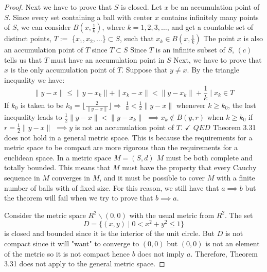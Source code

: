 \documentclass[aps,pra,notitlepage,amsmath,amssymb,letterpaper,12pt]{revtex4-1}
\begin{document}
\begin{proof}
    Next we have to prove that \(S\) is closed. Let \(x\) be an accumulation
point of \(S\). Since every set containing a ball with center \(x\)
contains infinitely many points of \(S\), we can consider
\(B(x,\frac{1}{k})\), where \(k = 1,2,3,\ldots\), and get a countable
set of distinct points, \(T:=\) \{\(x_1,x_2,\ldots\)\}\(\subset S\),
such that \(x_k\in B(x,\frac{1}{k})\) The point \(x\) is also an
accumulation point of \(T\) since \(T\subset S\) Since \(T\) is an
infinite subset of \(S\), \((c)\) tells us that \(T\) must have an
accumulation point in \(S\) Next, we have to prove that \(x\) is the
only accumulation point of \(T\). Suppose that \(y\ne x\). By the
triangle inequality we have:
\[\| y-x\| \leq\| y-x_k\| +\|x_k-x\| <\| y-x_k\| +\frac{1}{k} \mid x_k\in T\]
If \(k_0\) is taken to be $k_{0} = \lfloor \frac{2}{\|y-x\|} \rfloor \Rightarrow$ \(\frac{1}{k}<\frac{1}{2}\| y-x\|\)
whenever \(k\geq k_0\), the last inequality leads to
\(\frac{1}{2}\| y-x\| <\| y-x_k\|\) \(\implies x_k\notin B(y,r)\) when
\(k\geq k_0\) if \(r=\frac{1}{2}\| y-x\|\) \(\implies y\) is not an
accumulation point of \(T\). \(\checkmark\)
\(QED\)
\newline{}
Theorem 3.31 does not hold in a general metric space.  This is because the requirements for a metric space to be compact are more rigorous than the requirements for a euclidean space.  In a metric space \(M=(S,d)\) \(M\) must be both complete and totally bounded.  This means that \(M\) must have the property that every Cauchy sequence in \(M\) converges in \(M\), and it must be possible to cover \(M\) with a finite number of balls with of fixed size.  For this reason, we still have that \(a\implies b\) but the theorem will fail when we try to prove that \(b\implies a\).  
    
    Consider the metric space \(R^2\backslash (0,0)\) with the usual metric from \(R^2\).  The set 
    \[D=\{(x,y)\mid 0<x^2+y^2\leq 1\}\]
    is closed and bounded since it is the interior of the unit circle.  But \(D\) is not compact since it will "want" to converge to \((0,0)\) but \((0,0)\) is not an element of the metric so it is not compact hence \(b\) does not imply \(a\).  Therefore, Theorem 3.31 does not apply to the general metric space.  
\end{proof}
\end{document}
